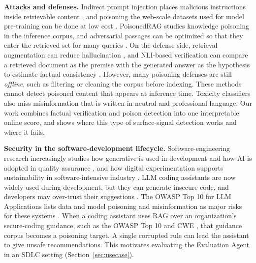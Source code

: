 \textbf{Attacks and defenses.} Indirect prompt injection places malicious instructions inside retrievable content \cite{greshake2023indirect}, and poisoning the web-scale datasets used for model pre-training can be done at low cost \cite{carlini2024poisoning}. PoisonedRAG \cite{zou2024poisoned} studies knowledge poisoning in the inference corpus, and adversarial passages can be optimized so that they enter the retrieved set for many queries \cite{zhong2023poisoning}. On the defense side, retrieval augmentation can reduce hallucination \cite{shuster2021retrieval}, and NLI-based verification can compare a retrieved document as the premise with the generated answer as the hypothesis to estimate factual consistency \cite{maynez2020faithfulness}\cite{honovich2022true}. However, many poisoning defenses are still \emph{offline}, such as filtering or cleaning the corpus before indexing. These methods cannot detect poisoned content that appears at inference time. Toxicity classifiers also miss misinformation that is written in neutral and professional language.  \cite{xiang2024robustrag} \cite{cheng2025raguard} Our work combines factual verification and poison detection into one interpretable online score, and shows where this type of surface-signal detection works and where it fails.

\textbf{Security in the software-development lifecycle.} Software-engineering research increasingly studies how generative  is used in development \cite{tuomisto2025ethical} and how AI is adopted in quality assurance \cite{karhu2025barriers}, and how digital experimentation supports sustainability in software-intensive industry \cite{jantti2025digital}. LLM coding assistants are now widely used during development, but they can generate insecure code, and developers may over-trust their suggestions \cite{pearce2022}\cite{perry2023}. The OWASP Top 10 for LLM Applications lists data and model poisoning and misinformation as major risks for these systems \cite{owaspllm2025}. When a coding assistant uses RAG over an organization's secure-coding guidance, such as the OWASP Top 10 \cite{owasp2021} and CWE \cite{mitrecwe}, that guidance corpus becomes a poisoning target. A single corrupted rule can lead the assistant to give unsafe recommendations. This motivates evaluating the Evaluation Agent in an SDLC setting (Section~\ref{sec:usecase}).

